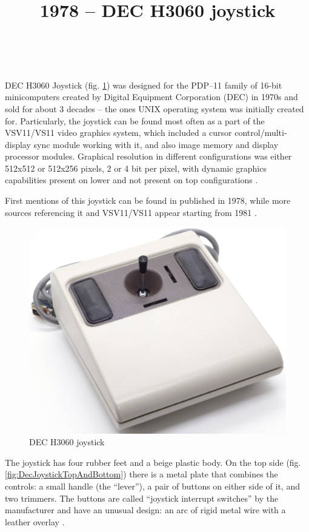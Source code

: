 \documentclass[11pt, a4paper]{article}
\begin{document}
\title{1978 -- DEC H3060 joystick}
\date{}
\author{~}
\maketitle
{}

DEC H3060 Joystick (fig. \ref{fig:DecJoystickPic}) was designed for the PDP–11 family of 16-bit minicomputers created by Digital Equipment Corporation (DEC) in 1970s and sold for about 3 decades -- the ones UNIX operating system was initially created for. Particularly, the joystick can be found most often as a part of the VSV11/VS11 video graphics system, which included a cursor control/multi-display sync module working with it, and also image memory and display processor modules. Graphical resolution in different configurations was either 512x512 or 512x256 pixels, 2 or 4 bit per pixel, with dynamic graphics capabilities present on lower and not present on top configurations \cite{joystick}.

First mentions of this joystick can be found in \cite{fiche} published in 1978, while more sources referencing it and VSV11/VS11 appear starting from 1981 \cite{flyer, vsv11}.

\begin{figure}[h]
   \centering
    \includegraphics[scale=0.53]{1978_dec_h3060_joystick/pic_30.jpg}
    \caption{DEC H3060 joystick}
    \label{fig:DecJoystickPic}
\end{figure}

The joystick has four rubber feet and a beige plastic body. On the top side (fig. \ref{fig:DecJoystickTopAndBottom}) there is a metal plate that combines the controls: a small handle (the ``lever''), a pair of buttons on either side of it, and two trimmers. The buttons are called ``joystick interrupt switches'' by the manufacturer \cite{vsv11} and have an unusual design: an arc of rigid metal wire with a leather overlay \cite{joystick}.
\end{document}
